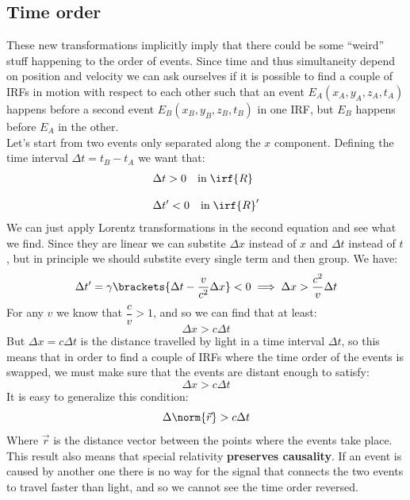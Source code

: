 \subsection{Time order}
These new transformations implicitly imply that there could be some ``weird'' stuff happening to the order of events. Since time and thus simultaneity depend on position and velocity we can ask ourselves if it is possible to find a couple of IRFs in motion with respect to each other such that an event $E_A(x_A,y_A,z_A,t_A)$ happens before a second event $E_B(x_B,y_B,z_B,t_B)$ in one IRF, but $E_B$ happens before $E_A$ in the other.\\
Let's start from two events only separated along the $x$ component. Defining the time interval $\Delta t = t_B - t_A$ we want that:
\begin{equation}
  \begin{split}
    &\Delta t > 0 \quad \text{in} \;\irf{R} \\[8pt]
    &\Delta t' < 0 \quad \text{in} \;\irf{R}'
  \end{split}
\end{equation}
We can just apply Lorentz transformations in the second equation and see what we find. Since they are linear we can substite $\Delta x$ instead of $x$ and $\Delta t$ instead of $t$, but in principle we should substite every single term and then group. We have:
\begin{equation}
  \Delta t' = \gamma \brackets{\Delta t - \dfrac{v}{c^2}\Delta x} < 0 \implies \Delta x > \dfrac{c^2}{v}\Delta t
\end{equation}
For any $v$ we know that $\dfrac{c}{v} > 1$, and so we can find that at least:
\begin{equation}
  \Delta x > c\Delta t
\end{equation}
But $\Delta x = c\Delta t$ is the distance travelled by light in a time interval $\Delta t$, so this means that in order to find a couple of IRFs where the time order of the events is swapped, we must make sure that the events are distant enough to satisfy:
\begin{equation}
  \Delta x > c\Delta t
\end{equation}
It is easy to generalize this condition:
\begin{equation}
  \Delta \norm{\vec{r}} > c\Delta t
\end{equation}
Where $\vec{r}$ is the distance vector between the points where the events take place.\\
This result also means that special relativity \textbf{preserves causality}. If an event is caused by another one there is no way for the signal that connects the two events to travel faster than light, and so we cannot see the time order reversed.
